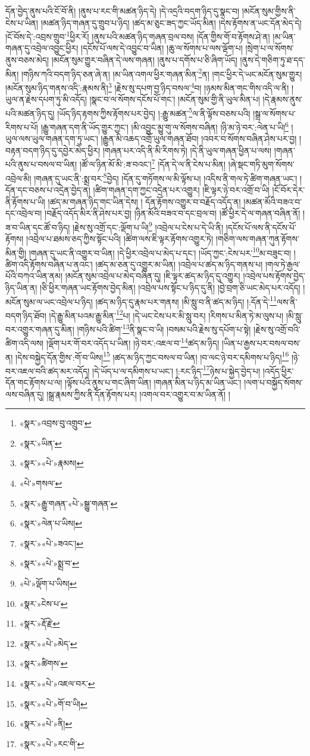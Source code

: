དོན་བྱེད་ནུས་པའི་ངོ་བོ་ནི། །ནུས་པ་རང་གི་མཚན་ཉིད་དེ། །དེ་འདྲའི་བདག་ཉིད་དུ་སྣང་བ། །མངོན་སུམ་གྱིས་ནི་ངེས་པ་ཡིན། །མཚན་ཉིད་གཞན་དུ་གྲུབ་པ་ཉིད། །ཚད་མ་ཅུང་ཟད་ཀྱང་ཡོད་མིན། །དེས་རྟོགས་ན་ཡང་དོན་མེད་དེ། །ངོ་བོས་དེ་:འབྲས་གྲུབ་\footnote{«སྣར་»འབྲས་བུ་འགྲུབ་}ཕྱིར་རོ། །ནུས་པའི་མཚན་ཉིད་གཞན་བྲལ་བས། །དོན་གྱིས་གོ་བ་རྟོགས་ཤེ་ན། །མ་ཡིན་གཞན་དུ་འབྲེལ་འབྱུང་ཕྱིར། །དངོས་པོ་ལས་དེ་འབྱུང་བ་ཡིན། །ཆུ་ལ་སོགས་པ་ལས་ལྡོག་པ། །སྲེག་པ་ལ་སོགས་ནུས་བཅས་མེད། །མངོན་སུམ་གྱུར་བཞིན་དེ་ལས་གཞན། །ནུས་པ་དགོས་པ་ཅི་ཞིག་ཡོད། །ནུས་དེ་གཅིག་ཏུ་ཐ་དད་མིན། །གཉིས་ཀའི་བདག་ཉིད་ཅན་ཞེ་ན། །མ་ཡིན་འགལ་ཕྱིར་གཞན་མིན་\footnote{«སྣར་»ཡིན་}ན། །གང་ཕྱིར་དེ་ཡང་མངོན་སུམ་གྱུར། །མངོན་སུམ་ཉིད་གནས་འདི་:རྣམས་ནི།\footnote{«སྣར་»«པེ་»རྣམས།} །རྗེས་སུ་དཔག་བྱ་ཉིད་བསལ་\footnote{«པེ་»གསལ་}བ། །ཉམས་མིན་གང་གིས་འདི་ལ་ནི། །ཡུལ་ན་རྗེས་དཔག་ཏུ་མི་འདོད། །སྣང་བ་ལ་སོགས་དངོས་པོ་གང་། །མངོན་སུམ་གྱི་ནི་ཡུལ་མིན་པ། །དེ་རྣམས་ནུས་པའི་མཚན་ཉིད་དུ། །ཡོད་ཉིད་རྟགས་ཀྱིས་རྟོགས་པར་བྱེད། །:རྒྱུ་མཚན་\footnote{«སྣར་»རྒྱུ་གཞན་«པེ་»སྒྱུ་གཞན་}ལ་ནི་ལྟོས་བཅས་པའི། །སྒྲ་ལ་སོགས་པ་རིགས་པ་པོ། །རྒྱུ་གཞན་དག་ནི་ཡོད་གྱུར་ཀྱང་། །མི་འབྱུང་མྱུ་གུ་ལ་སོགས་བཞིན། །ཉི་མ་ཉེ་བར་:ལེན་པ་ཡི།\footnote{«སྣར་»ལེན་པ་ཡིས།} །ཡུལ་ལས་ཡུལ་གཞན་དག་ཏུ་ཡང་། །རྒྱུན་མི་འཆད་འགྲོ་ཡུལ་གཞན་ཐོབ། །འབར་བ་སོགས་བཞིན་ཤེས་པར་བྱ། །བརྟན་བདག་ཉིད་དུ་དབྱེར་མེད་ཕྱིར། །གཞན་པར་འདི་ནི་མི་རིགས་ཏེ། །དེ་ནི་ཡུལ་གཞན་ཕྱིན་པ་ལས། །གཞན་པའི་ནུས་པ་བསལ་བ་ཡིན། །ཚོ་ལ་ཉིན་མོ་མི་:ཟ་བའང་།\footnote{«སྣར་»«པེ་»ཟའང་།} །དོན་དེ་ལ་ནི་ངེས་པ་མིན། །ཞེ་སྡང་གཏི་མུག་སོགས་འབྲེལ་མི། །གཞན་དུ་ཡང་ནི་:སྨྲ་བར་\footnote{«སྣར་»«པེ་»སྨྲ་བ་}བྱེད། །དོན་དུ་གཏོགས་ལ་མི་ལྟོས་པ། །འདིས་ནི་གལ་ཏེ་ཚིག་གཞན་ཡང་། །དོན་དང་བཅས་པ་འདྲེན་བྱེད་ན། །ཚིག་གཞན་དག་ཀྱང་འདྲེན་པར་འགྱུར། །ཇི་ལྟར་ཉེ་བར་འགྲོ་བ་ཡི། །ངོ་བོར་དེར་ནི་རྟོགས་པ་ཡི། །ཚད་མ་གཞན་ཉིད་གང་ཡིན་དེས། །
དོན་རྟོགས་འགྱུར་བ་བརྗོད་འདོད་ན། །མཚན་མོའི་བཟའ་བ་དང་འབྲེལ་བ། །བརྗོད་འདོད་མིར་ནི་ཤེས་པར་བྱ། །ཉིན་མོའི་བཟའ་བ་དང་བྲལ་བ། །ཚོ་ཕྱིར་དེ་ལ་གཞན་བཞིན་ནོ། །ཟ་བ་ཡིན་དང་ཚོ་བ་ཉིད། །རྗེས་སུ་འགྲོ་དང་:ལྡོག་པ་ཡི།\footnote{«པེ་»ལྡོག་པ་ཡིས།} །འབྲེལ་པ་ངེས་པ་དེ་ཡི་ནི། །དངོས་པོ་ལས་ནི་དངོས་པོ་རྟོགས། །འབྲེལ་པ་ཐམས་ཅད་ཀྱིས་སྟོང་པའི། །ཚིག་ལས་ཇི་ལྟར་རྟོགས་འགྱུར་ཏེ། །གཅིག་ལས་གཞན་ཀུན་རྟོགས་མིན་གྱི། །གཞན་དུ་ཡང་ནི་འགྱུར་བ་ཡིན། །དེ་ཕྱིར་འབྲེལ་པ་མེད་པ་དང་། །ཡོད་ཀྱང་:ངེས་པར་\footnote{«སྣར་»ངེས་པ་}མ་བཟུང་བ། །ཚིག་འདི་རྟོགས་བཞིན་པ་ནའང་། །ཚད་མ་ཅན་དུ་འགྱུར་མ་ཡིན། །འབྲེལ་པ་ཚད་མ་ཉིད་གནས་པ། །གལ་ཏེ་རྒྱལ་པོའི་བཀའ་ཡིན་ནམ། །མངོན་སུམ་འབྲེལ་པ་མེད་བཞིན་དུ། །ཇི་ལྟར་ཚད་མ་ཉིད་དུ་འགྱུར། །འབྲེལ་པས་རྟོགས་བྱེད་ཉིད་ཡིན་ན། །ཅི་ཕྱིར་གཞན་ཡང་རྟོགས་བྱེད་མིན། །འབྲེལ་པས་སྟོང་པ་ཉིད་དུ་ནི། །བྱེ་བྲག་ཅི་ཡང་མེད་པར་འདོད། །མངོན་སུམ་ལ་ཡང་འབྲེལ་པ་ཉིད། །ཚད་མ་ཉིད་དུ་རྣམ་པར་གནས། །མི་སླུ་བ་ནི་ཚད་མ་ཉིད། །:དོན་དེ་\footnote{«སྣར་»རྡོ་རྗེ་}ལས་ནི་བདག་ཉིད་ཐོབ། །དེ་རྒྱུ་མིན་པའམ་རྒྱུ་མིན་\footnote{«སྣར་»«པེ་»མེད་}པ། །དེ་ཡང་ངེས་པར་མི་སླུ་བར། །རིགས་པ་མིན་ཏེ་མ་ལུས་པ། །མི་སླུ་བར་འགྱུར་གཞན་དུ་མིན། །གཉིས་པའི་ཚིག་\footnote{«སྣར་»ཚིགས་}ནི་སྣང་བ་ཡི། །བསམ་པའི་རྗེས་སུ་དཔོག་པ་སྟེ། །རྗེས་སུ་འགྲོ་བའི་ཚིག་འདི་ལས། །ལྡོག་པར་གོ་བར་འདོད་པ་ཡིན། །ཉེ་བར་:འཇལ་བ་\footnote{«སྣར་»«པེ་»འཇལ་བར་}ཚད་མ་ཉིད། །ཡིན་པ་རྒྱས་པར་བསལ་བས་ན། །དེས་བསྐྱེད་དོན་གྱིས་:གོ་བ་ཡིས།\footnote{«སྣར་»«པེ་»གོ་བ་ཡི།} །ཚད་མ་ཉིད་ཀྱང་བསལ་བ་ཡིན། །བ་ལང་ཉེ་བར་དམིགས་པ་ཉིད།\footnote{«སྣར་»«པེ་»ནི།} །ཉེ་བར་འཇལ་བའི་ཚད་མར་འདོད། །དེ་ཡོད་པ་ལ་དམིགས་པ་ཡང་། །:རང་ཉིད་\footnote{«སྣར་»«པེ་»རང་གི་}ཉེས་པ་སྐྱེད་བྱེད་པ། །འདོད་ཕྱིར་དོན་གང་རྟོགས་པ་ལ། །ལྟོས་པའི་ནུས་པ་གང་ཞིག་ཡིན། །གཞན་མིན་པ་ཉིད་མ་ཡིན་ཡང་། །ལག་པ་བསྐྱོད་སོགས་ལས་བཞིན་དུ། །སྒྲ་རྣམས་ཀྱིས་ནི་དོན་རྟོགས་པར། །འགལ་བར་འགྱུར་བ་མ་ཡིན་ནོ། །
